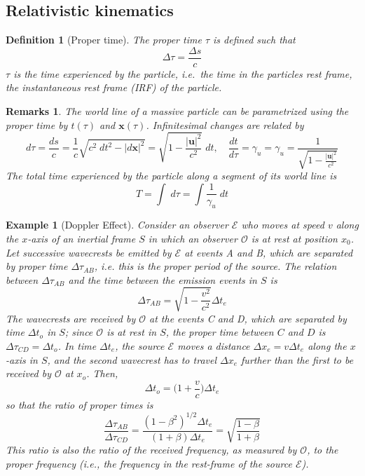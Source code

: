 \documentclass[a4paper]{article}
\newtheorem{defi}{Definition}[section]
\newtheorem{remarks}{Remarks}[section]
\newtheorem{eg}{Example}[section]
\theoremstyle{new}
\begin{document}
\subsection{Relativistic kinematics}
\begin{defi}[Proper time]
  The proper time $\tau$ is defined such that
$$\Delta \tau = \frac{\Delta s}{c}$$
  $\tau$ is the time experienced by the particle, i.e.\ the time in the particles rest frame, the instantaneous rest frame (IRF) of the particle.
\end{defi}
\begin{remarks}
The world line of a massive particle can be parametrized using the proper time by $t(\tau)$ and $\mathbf{x}(\tau)$. Infinitesimal changes are related by
$$d \tau = \frac{d s}{c} = \frac{1}{c}\sqrt{c^2\;d t^2 - |d \mathbf{x}|^2} = \sqrt{1 - \frac{|\mathbf{u}|^2}{c^2}}\;d t,\quad\frac{d t}{d \tau} = \gamma_u=  \gamma_u = \frac{1}{\sqrt{1 - \frac{|\mathbf{u}|^2}{c^2}}}$$
The total time experienced by the particle along a segment of its world line is
$$T = \int \;d \tau = \int\frac{1}{\gamma_u}\;d t$$
\end{remarks}
\begin{eg}[Doppler Effect]
Consider an observer $\mathcal{E}$ who moves at speed $v$ along the $x$-axis of an inertial frame $S$ in which an observer $\mathcal{O}$ is at rest at position $x_0$. Let successive wavecrests be emitted by $\mathcal{E}$ at events A and B, which are separated by proper time $\Delta\tau_{AB}$, i.e. this is the proper period of the source. The relation between $\Delta\tau_{AB}$ and the time between the emission events in $S$ is
$$\Delta\tau_{AB}=\sqrt{1-\frac{v^2}{c^2}}\Delta t_e$$
The wavecrests are received by $\mathcal{O}$ at the events C and D, which are separated by time $\Delta t_o$ in $S$; since $\mathcal{O}$ is at rest in $S$, the proper time between $C$ and $D$ is $\Delta\tau_{CD}=\Delta t_o$. In time $\Delta t_e$, the source $\mathcal{E}$ moves a distance $\Delta x_e=v\Delta t_e$ along the $x$-axis in $S$, and the second wavecrest has to travel $\Delta x_e$ further than the first to be received by $\mathcal{O}$ at $x_o$. Then,
$$\Delta t_o=\bigg(1+\frac{v}{c}\bigg)\Delta t_e$$
so that the ratio of proper times is
$$\frac{\Delta\tau_{AB}}{\Delta\tau_{CD}}=\frac{(1-\beta^2)^{1/2}\Delta t_e}{(1+\beta)\Delta t_e}=\sqrt{\frac{1-\beta}{1+\beta}}$$
This ratio is also the ratio of the received frequency, as measured by $\mathcal{O}$, to the proper frequency (i.e., the frequency in the rest-frame of the source $\mathcal{E}$).
\end{eg}
\end{document}
